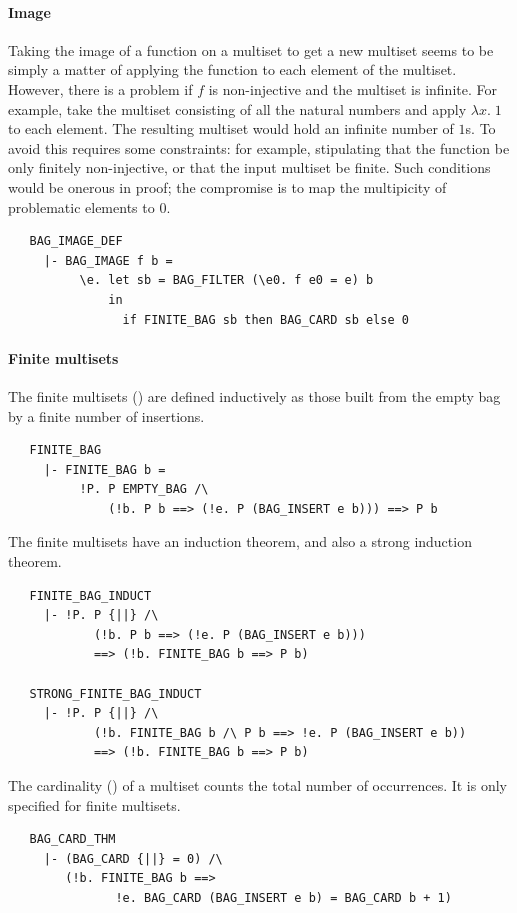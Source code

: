 {\paragraph {Image}

Taking the image of a function on a multiset to get a new multiset
seems to be simply a matter of applying the function to each element
of the multiset. However, there is a problem if $f$ is non-injective
and the multiset is infinite. For example, take the multiset
consisting of all the natural numbers and apply $\lambda x.\; 1$ to
each element. The resulting multiset would hold an infinite number of
$1$s. To avoid this requires some constraints: for example,
stipulating that the function be only finitely non-injective, or that
the input multiset be finite. Such conditions would be onerous in
proof; the compromise is to map the multipicity of problematic
elements to $0$.
%
\begin{hol}
\begin{verbatim}
   BAG_IMAGE_DEF
     |- BAG_IMAGE f b =
          \e. let sb = BAG_FILTER (\e0. f e0 = e) b
              in
                if FINITE_BAG sb then BAG_CARD sb else 0
\end{verbatim}
\end{hol}


\paragraph {Finite multisets}
The finite multisets () are defined inductively as
those built from the empty bag by a finite number of insertions.
%
\begin{hol}
\begin{verbatim}
   FINITE_BAG
     |- FINITE_BAG b =
          !P. P EMPTY_BAG /\
              (!b. P b ==> (!e. P (BAG_INSERT e b))) ==> P b
\end{verbatim}
\end{hol}
%
The finite multisets have an induction theorem, and also a strong
induction theorem.
%
%
\begin{hol}
\begin{verbatim}
   FINITE_BAG_INDUCT
     |- !P. P {||} /\
            (!b. P b ==> (!e. P (BAG_INSERT e b)))
            ==> (!b. FINITE_BAG b ==> P b)

   STRONG_FINITE_BAG_INDUCT
     |- !P. P {||} /\
            (!b. FINITE_BAG b /\ P b ==> !e. P (BAG_INSERT e b))
            ==> (!b. FINITE_BAG b ==> P b)
\end{verbatim}
\end{hol}
%
The cardinality () of a multiset counts the
total number of occurrences. It is only specified for finite multisets.
%
\begin{hol}
\begin{verbatim}
   BAG_CARD_THM
     |- (BAG_CARD {||} = 0) /\
        (!b. FINITE_BAG b ==>
               !e. BAG_CARD (BAG_INSERT e b) = BAG_CARD b + 1)
\end{verbatim}
\end{hol}

}
